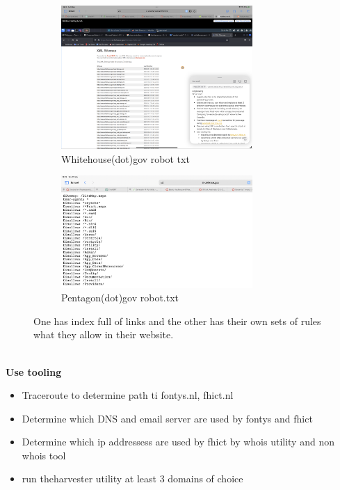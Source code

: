 \documentclass[12pt, letterpaper]{article}
\begin{document}
\begin{figure}[!ht]
    \begin{subfigure}{.5\textwidth}
        \centering
        \includegraphics[width=0.8\textwidth]{PDFs/Week 2/Whitehouse-gov-robotstxt.png}
        \caption{Whitehouse(dot)gov robot txt}
    \end{subfigure}
    \begin{subfigure}{.5\textwidth}
        \centering
        \includegraphics[width=0.8\textwidth]{fotos/Week 2/Pentagonrobot.jpeg}
        \caption{Pentagon(dot)gov robot.txt}
    \end{subfigure}
\caption{One has index full of links and the other has their own sets of rules what they allow in their website.}
\end{figure}\mbox{}\\
\hfill\break
\hfill\break
\textbf{Use tooling}
\hfill\break
\hfill\break
\begin{itemize}
    \item Traceroute to determine path ti fontys.nl, fhict.nl
    \item Determine which DNS and email server are used by fontys and fhict
    \item Determine which ip addressess are used by fhict by whois utility and non whois tool
    \item run theharvester utility at least 3 domains of choice
\end{itemize}
\end{document}

